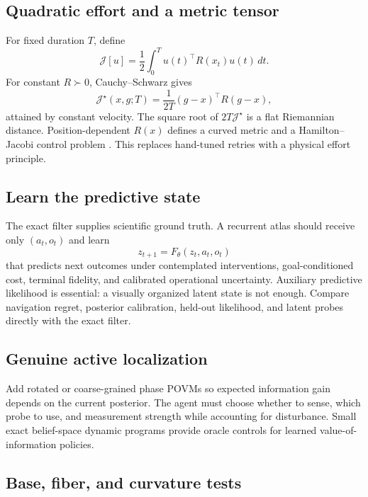 \documentclass[11pt]{article}
\theoremstyle{definition}\newtheorem{definition}[theorem]{Definition}
\theoremstyle{remark}\newtheorem{remark}[theorem]{Remark}
\begin{document}
\subsection{Quadratic effort and a metric tensor}

For fixed duration \(T\), define
\begin{equation}
\mathcal J[u]=\frac12\int_0^T u(t)^\top R(x_t)u(t)\,dt.
\label{eq:energy}
\end{equation}
For constant \(R\succ0\), Cauchy--Schwarz gives
\begin{equation}
\mathcal J^\star(x,g;T)=
\frac1{2T}(g-x)^\top R(g-x),
\label{eq:energy-opt}
\end{equation}
attained by constant velocity. The square root of
\(2T\mathcal J^\star\) is a flat Riemannian distance. Position-dependent
\(R(x)\) defines a curved metric and a Hamilton--Jacobi control problem
\cite{dalessandro2008}. This replaces hand-tuned retries with a physical
effort principle.

\subsection{Learn the predictive state}

The exact filter supplies scientific ground truth. A recurrent atlas should
receive only \((a_t,o_t)\) and learn
\[
z_{t+1}=F_\theta(z_t,a_t,o_t)
\]
that predicts next outcomes under contemplated interventions, goal-conditioned
cost, terminal fidelity, and calibrated operational uncertainty. Auxiliary
predictive likelihood is essential: a visually organized latent state is not
enough. Compare navigation regret, posterior calibration, held-out likelihood,
and latent probes directly with the exact filter.

\subsection{Genuine active localization}

Add rotated or coarse-grained phase POVMs so expected information gain depends
on the current posterior. The agent must choose whether to sense, which probe
to use, and measurement strength while accounting for disturbance. Small exact
belief-space dynamic programs provide oracle controls for learned
value-of-information policies.

\subsection{Base, fiber, and curvature tests}
\end{document}
